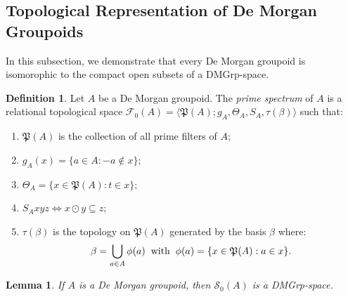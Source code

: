 \documentclass{amsart}
\theoremstyle{plain}
\newtheorem{lemma}[theorem]{Lemma}
\theoremstyle{definition}
\newtheorem{definition}[theorem]{Definition}
\begin{document}
\subsection{Topological Representation of De Morgan Groupoids} In this subsection, we demonstrate that every De Morgan groupoid is isomorophic to the compact open subsets of a DMGrp-space. 
\begin{definition}\label{prime spectrum1}
    Let $A$ be a De Morgan groupoid. The \emph{prime spectrum} of $A$ is a relational topological space $\mathcal{F}_0(A)=\langle\mathfrak{P}(A); g_A,\Theta_A,S_A,\tau(\beta)\rangle$ such that: 
    \begin{enumerate}
        \item $\mathfrak{P}(A)$ is the collection of all prime filters of $A$; 
        \item $g_A(x)=\{a\in A:-a\not\in x\}$; 
        \item $\Theta_A=\{x\in\mathfrak{P}(A):t\in x\}$; 
        \item $S_Axyz\Longleftrightarrow x\odot y\subseteq z$; 
        \item $\tau(\beta)$ is the topology on $\mathfrak{P}(A)$ generated by the basis $\beta$ where: 
        \[\beta=\bigcup_{a\in A}\phi(a)\hspace{.2cm}\text{with}\hspace{.2cm}\phi(a)=\{x\in\mathfrak{P}(A):a\in x\}.\]
    \end{enumerate}
\end{definition}
\begin{lemma}\label{lemma 4.7}
    If $A$ is a De Morgan groupoid, then $\mathcal{S}_0(A)$ is a DMGrp-space. 
\end{lemma}
\end{document}
